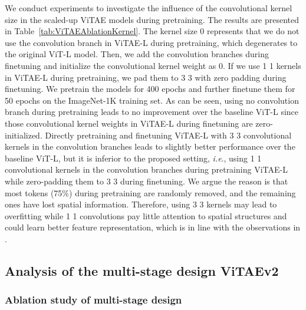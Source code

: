 \documentclass[twocolumn]{svjour3}          \smartqed  \usepackage{natbib}
\newcommand{\ie}{i.e}
\def\onedot{.\xspace}
\def\ie{\emph{i.e}\onedot}
\begin{document}
We conduct experiments to investigate the influence of the convolutional kernel size in the scaled-up ViTAE models during pretraining. The results are presented in Table~\ref{tab:ViTAEAblationKernel}. The kernel size 0 represents that we do not use the convolution branch in ViTAE-L during pretraining, which degenerates to the original ViT-L model. Then, we add the convolution branches during finetuning and initialize the convolutional kernel weight as 0. If we use 1  1 kernels in ViTAE-L during pretraining, we pad them to 3  3 with zero padding during finetuning. We pretrain the models for 400 epochs and further finetune them for 50 epochs on the ImageNet-1K training set. As can be seen, using no convolution branch during pretraining leads to no improvement over the baseline ViT-L since those convolutional kernel weights in ViTAE-L during finetuning are zero-initialized. Directly pretraining and finetuning ViTAE-L with 3  3 convolutional kernels in the convolution branches leads to slightly better performance over the baseline ViT-L, but it is inferior to the proposed setting, \ie, using 1  1 convolutional kernels in the convolution branches during pretraining ViTAE-L while zero-padding them to 3  3 during finetuning. We argue the reason is that most tokens (75\%) during pretraining are randomly removed, and the remaining ones have lost spatial information. Therefore, using 3  3 kernels may lead to overfitting while 1  1 convolutions pay little attention to spatial structures and could learn better feature representation, which is in line with the observations in \citep{zhang2018fully}.

\subsection{Analysis of the multi-stage design ViTAEv2}
\subsubsection{Ablation study of multi-stage design}
\label{Stage-wise ViTAE design}
\end{document}
